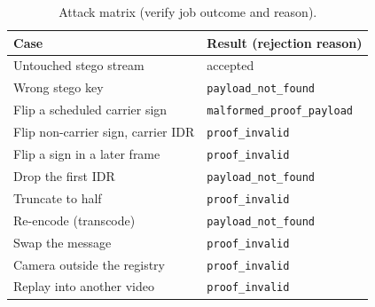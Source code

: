 \begin{table}[t]
\centering
\caption{Attack matrix (verify job outcome and reason).}
\label{tab:attacks}
\footnotesize
\begin{tabular}{@{}ll@{}}
\toprule
Case & Result (rejection reason) \\
\midrule
Untouched stego stream & accepted \\
Wrong stego key & \texttt{payload\_not\_found} \\
Flip a scheduled carrier sign & \texttt{malformed\_proof\_payload} \\
Flip non-carrier sign, carrier IDR & \texttt{proof\_invalid} \\
Flip a sign in a later frame & \texttt{proof\_invalid} \\
Drop the first IDR & \texttt{payload\_not\_found} \\
Truncate to half & \texttt{proof\_invalid} \\
Re-encode (transcode) & \texttt{payload\_not\_found} \\
Swap the message & \texttt{proof\_invalid} \\
Camera outside the registry & \texttt{proof\_invalid} \\
Replay into another video & \texttt{proof\_invalid} \\
\bottomrule
\end{tabular}
\end{table}
